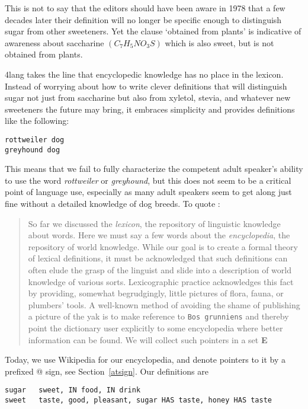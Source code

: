 \documentclass[11pt,bookmarks,bookmarksnumbered,naturalnames,plainpages=false,pdftex,colorlinks=true,urlcolor=blue,bookmarksdepth=subsection,plainpages=false]{paper}
\begin{document}
This is not to say that the editors should have been aware in 1978 that a few
decades later their definition will no longer be specific enough to
distinguish sugar from other sweeteners. Yet the clause `obtained from
plants' is indicative of awareness about saccharine $(C_7H_5NO_3S)$ which is
also sweet, but is not obtained from plants.  

4lang takes the line that encyclopedic knowledge has no place in the
lexicon. Instead of worrying about how to write clever definitions that will
distinguish sugar not just from saccharine but also from xyletol, stevia, and
whatever new sweeteners the future may bring, it embraces simplicity and
provides definitions like the following:

\begin{verbatim} 
rottweiler dog
greyhound dog
\end{verbatim}

\noindent
This means that we fail to fully characterize the competent adult speaker's
ability to use the word {\it rottweiler} or {\it greyhound}, but this does not
seem to be a critical point of language use, especially as many adult speakers
seem to get along just fine without a detailed knowledge of dog breeds. To
quote \cite{Kornai:2010}:

\begin{quote}
So far we discussed the {\it lexicon}, the repository of linguistic knowledge
about words. Here we must say a few words about the {\it encyclopedia}, the
repository of world knowledge. While our goal is to create a formal theory of
lexical definitions, it must be acknowledged that such definitions can often
elude the grasp of the linguist and slide into a description of world
knowledge of various sorts.  Lexicographic practice acknowledges this fact by
providing, somewhat begrudgingly, little pictures of flora, fauna, or
plumbers' tools. A well-known method of avoiding the shame of publishing a
picture of the yak is to make reference to {\tt Bos grunniens} and thereby
point the dictionary user explicitly to some encyclopedia where better
information can be found. We will collect such pointers in a set {\bf E}
\end{quote}

\noindent
Today, we use Wikipedia for our encyclopedia, and denote pointers to it by a
prefixed @ sign, see Section~\ref{atsign}. Our definitions are 

\begin{verbatim} 
sugar	sweet, IN food, IN drink
sweet	taste, good, pleasant, sugar HAS taste, honey HAS taste
\end{verbatim}
\end{document}
